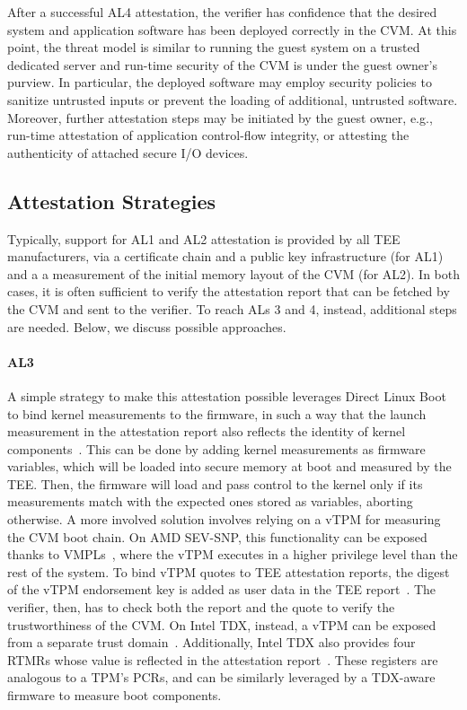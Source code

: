 After a successful AL4 attestation, the verifier has confidence that the desired
system and application software has been deployed correctly in the \ac{CVM}. At
this point, the threat model is similar to running the guest system on a trusted
dedicated server and run-time security of the \ac{CVM} is under the guest
owner's purview. In particular, the deployed software may employ security
policies to sanitize untrusted inputs or prevent the loading of additional,
untrusted software. Moreover, further attestation steps may be initiated by the
guest owner, e.g., run-time attestation of application control-flow integrity,
or attesting the authenticity of attached secure I/O devices.

\subsection{Attestation Strategies}
\label{section:att-examples}

Typically, support for AL1 and AL2 attestation is provided by all \ac{TEE}
manufacturers, via a certificate chain and a public key infrastructure (for AL1)
and a a measurement of the initial memory layout of the \ac{CVM} (for AL2). In
both cases, it is often sufficient to verify the attestation report that can be
fetched by the \ac{CVM} and sent to the verifier. To reach ALs 3 and 4, instead,
additional steps are needed. Below, we discuss possible approaches.

\paragraph{AL3}
%
A simple strategy to make this attestation possible leverages Direct Linux Boot
to bind kernel measurements to the firmware, in such a way that the launch
measurement in the attestation report also reflects the identity of kernel
components~\cite{kernelHashesOvmf}. This can be done by adding kernel
measurements as firmware variables, which will be loaded into secure memory at
boot and measured by the \ac{TEE}. Then, the firmware will load and pass control
to the kernel only if its measurements match with the expected ones stored as
variables, aborting otherwise. A more involved solution involves relying on a
\ac{vTPM} for measuring the \ac{CVM} boot chain. On AMD SEV-SNP, this
functionality can be exposed thanks to \acp{VMPL}~\cite{AmdSevAbi}, where the
\ac{vTPM} executes in a higher privilege level than the rest of the system. To
bind \ac{vTPM} quotes to \ac{TEE} attestation reports, the digest of the
\ac{vTPM} endorsement key is added as user data in the \ac{TEE}
report~\cite{narayanan2023svsm}. The verifier, then, has to check both the
report and the quote to verify the trustworthiness of the \ac{CVM}. On Intel
\ac{TDX}, instead, a \ac{vTPM} can be exposed from a separate trust
domain~\cite{intelTdxvTPM}. Additionally, Intel \ac{TDX} also provides four
\acp{RTMR} whose value is reflected in the attestation
report~\cite{intelTdxModule}. These registers are analogous to a \ac{TPM}'s
PCRs, and can be similarly leveraged by a TDX-aware firmware to measure boot
components.

